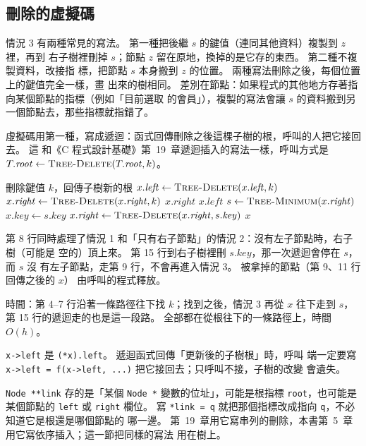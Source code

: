 \subsection{刪除的虛擬碼}

情況 3 有兩種常見的寫法。 第一種把後繼 $s$ 的鍵值（連同其他資料）複製到 $z$ 裡，再到
右子樹裡刪掉 $s$；節點 $z$ 留在原地，換掉的是它存的東西。 第二種不複製資料，改接指
標，把節點 $s$ 本身搬到 $z$ 的位置。 兩種寫法刪除之後，每個位置上的鍵值完全一樣，畫
出來的樹相同。 差別在節點：如果程式的其他地方存著指向某個節點的指標（例如「目前選取
的會員」），複製的寫法會讓 $s$ 的資料搬到另一個節點去，那些指標就指錯了。

虛擬碼用第一種，寫成遞迴：函式回傳刪除之後這棵子樹的根，呼叫的人把它接回去。 這
和《C 程式設計基礎》第~19~章遞迴插入的寫法一樣，呼叫方式是 $T.\mathit{root} \gets
\proc{Tree-Delete}(T.\mathit{root}, k)$。

\begin{pseudo}[label=alg:bst-delete]{刪除鍵值 $k$，回傳子樹新的根}
        \State \Return \NIL {}
    \EndIf
        \State $x.\mathit{left} \gets \Call{Tree-Delete}{x.\mathit{left}, k}$
        \State $x.\mathit{right} \gets \Call{Tree-Delete}{x.\mathit{right}, k}$
     
        \State \Return $x.\mathit{right}$
     
        \State \Return $x.\mathit{left}$
    \Else {}
        \State $s \gets \Call{Tree-Minimum}{x.\mathit{right}}$
        \State $x.\mathit{key} \gets s.\mathit{key}$ 
        \State $x.\mathit{right} \gets \Call{Tree-Delete}{x.\mathit{right}, s.\mathit{key}}$
    \EndIf
    \State \Return $x$
\EndFunction
\end{pseudo}

第 8 行同時處理了情況 1 和「只有右子節點」的情況 2：沒有左子節點時，右子樹（可能是
空的）頂上來。 第 15 行到右子樹裡刪 $s.\mathit{key}$，那一次遞迴會停在 $s$，而 $s$ 沒
有左子節點，走第 9 行，不會再進入情況 3。 被拿掉的節點（第 9、11 行回傳之後的 $x$）
由呼叫的程式釋放。

時間：第 4--7 行沿著一條路徑往下找 $k$；找到之後，情況 3 再從 $x$ 往下走到 $s$，
第 15 行的遞迴走的也是這一段路。 全部都在從根往下的一條路徑上，時間 $O(h)$。

\begin{cbookrecap}[第~14~章、第~15~章、第~19~章 19.10、19.11、19.15 節]
\texttt{x->left} 是 \texttt{(*x).left}。 遞迴函式回傳「更新後的子樹根」時，呼叫
端一定要寫 \texttt{x->left = f(x->left, ...)} 把它接回去；只呼叫不接，子樹的改變
會遺失。

\texttt{Node **link} 存的是「某個 \texttt{Node *} 變數的位址」，可能是根指標
\texttt{root}，也可能是某個節點的 \texttt{left} 或 \texttt{right} 欄位。 寫
\texttt{*link = q} 就把那個指標改成指向 \texttt{q}，不必知道它是根還是哪個節點的
哪一邊。 第~19~章用它寫串列的刪除，本書第~5~章用它寫依序插入；這一節把同樣的寫法
用在樹上。
\end{cbookrecap}


